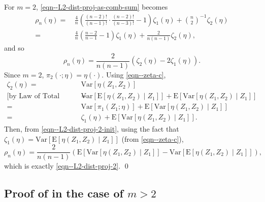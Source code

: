 \documentclass[12pt]{article}
\numberwithin{equation}{section}
\theoremstyle{definition}
\theoremstyle{plain}
\begin{document}
For \(m = 2\), \eqref{eqn--L2-dist-proj-as-comb-sum} becomes
\begin{align*}
  \rho_{n} (\eta) =
  & \, \frac{4}{n} \left( \frac{(n - 2)!}{(n - 1)!} \cdot \frac{(n - 2)!}{(n
  - 3)!} - 1 \right) \zeta_{1} (\eta) + \binom{n}{2}^{- 1} \zeta_{2} (\eta) \\
  =
  & \, \frac{4}{n} \left( \frac{n - 2}{n - 1} - 1 \right) \zeta_{1} (\eta)
  + \frac{2}{n (n - 1)} \zeta_{2} (\eta),
\end{align*}
and so
\begin{equation}
  \rho_{n} (\eta) =
  \frac{2}{n (n - 1)} \left( \zeta_{2} (\eta) - 2 \zeta_{1} (\eta) \right).
  \label{eqn--L2-dist-proj-2-init}
\end{equation}
Since \(m = 2\), \(\pi_{2} \left( \cdot; \eta \right) = \eta (\cdot)\).
Using \eqref{eqn--zeta-c},
\begin{align*}
  \zeta_{2} (\eta) =
  & \, \mathrm{Var} \left[ \eta \left( Z_{1}, Z_{2} \right) \right] \\
  \text{[by Law of Total Variance]} \quad =
  & \, \mathrm{Var} \left[ \mathrm{E} \left[ \eta \left( Z_{1}, Z_{2} \right)
  \middle| Z_{1} \right] \right] + \mathrm{E} \left[ \mathrm{Var} \left[ \eta
  \left( Z_{1}, Z_{2} \right) \middle| Z_{1} \right] \right] \\
  =
  & \, \mathrm{Var} \left[ \pi_{1} \left( Z_{1}; \eta \right) \right] +
  \mathrm{E} \left[ \mathrm{Var} \left[ \eta \left( Z_{1}, Z_{2} \right)
  \middle| Z_{1} \right] \right] \\
  =
  & \, \zeta_{1} (\eta) + \mathrm{E} \left[ \mathrm{Var} \left[ \eta \left(
  Z_{1}, Z_{2} \right) \middle| Z_{1} \right] \right].
\end{align*}
Then, from \eqref{eqn--L2-dist-proj-2-init}, using the fact that
\(\zeta_{1} (\eta) = \mathrm{Var} \left[ \mathrm{E} \left[ \eta \left( Z_{1},
Z_{2} \right) \middle| Z_{1} \right] \right]\) (from \eqref{eqn--zeta-c}),
\begin{equation*}
  \rho_{n} (\eta) = \frac{2}{n (n - 1)} \left( \mathrm{E} \left[
  \mathrm{Var} \left[ \eta \left( Z_{1}, Z_{2} \right) \middle| Z_{1} \right]
  \right] - \mathrm{Var} \left[ \mathrm{E} \left[ \eta \left( Z_{1}, Z_{2}
  \right) \middle| Z_{1} \right] \right] \right),
\end{equation*}
which is exactly \eqref{eqn--L2-dist-proj-2}.
\qed

\subsection{Proof of \texorpdfstring{}{Theorem
\ref{thm--L2-dist-proj}} in the case of \texorpdfstring{\(m > 2\)}{m > 2}}
\end{document}
